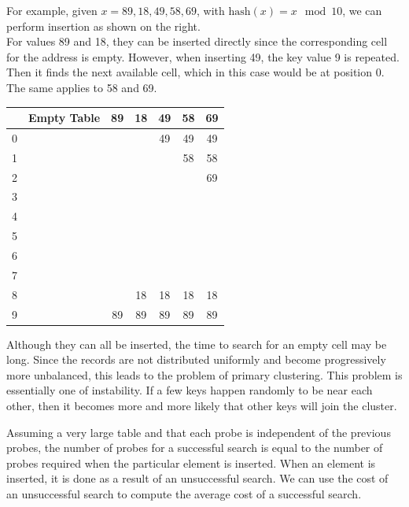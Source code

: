 \begin{minipage}{0.5\textwidth}
For example, given \(x = 89, 18, 49, 58, 69\), with \(\text{hash}(x) = x \mod 10\), we can perform insertion as shown on the right.\\[3pt]
For values 89 and 18, they can be inserted directly since the corresponding cell for the address is empty. However, when inserting 49, the key value 9 is repeated. Then it finds the next available cell, which in this case would be at position 0. The same applies to 58 and 69.
\end{minipage}
\begin{minipage}{0.5\textwidth}
\begin{table}[H]
  \centering
  \begin{tabular}{c|c|c|c|c|c|c}
      \toprule
        & Empty Table & 89 & 18 & 49 & 58 & 69  \\
    \midrule
      0 &  &  &  & 49 & 49 & 49  \\
      1 &  &  &  &  & 58 & 58  \\
      2 &  &  &  &  &  & 69  \\
      3 &  &  &  &  &  &   \\
      4 &  &  &  &  &  &   \\
      5 &  &  &  &  &  &   \\
      6 &  &  &  &  &  &   \\
      7 &  &  &  &  &  &   \\
      8 &  &  & 18 & 18 & 18 & 18  \\
      9 &  & 89 & 89 & 89 & 89 & 89  \\
      \bottomrule
  \end{tabular}
\end{table}
\end{minipage}

Although they can all be inserted, the time to search for an empty cell may be long. Since the records are not distributed uniformly and become progressively more unbalanced, this leads to the problem of primary clustering. This problem is essentially one of instability. If a few keys happen randomly to be near each other, then it becomes more and more likely that other keys will join the cluster.  

Assuming a very large table and that each probe is independent of the previous probes, the number of probes for a successful search is equal to the number of probes required when the particular element is inserted. When an element is inserted, it is done as a result of an unsuccessful search. We can use the cost of an unsuccessful search to compute the average cost of a successful search. 


